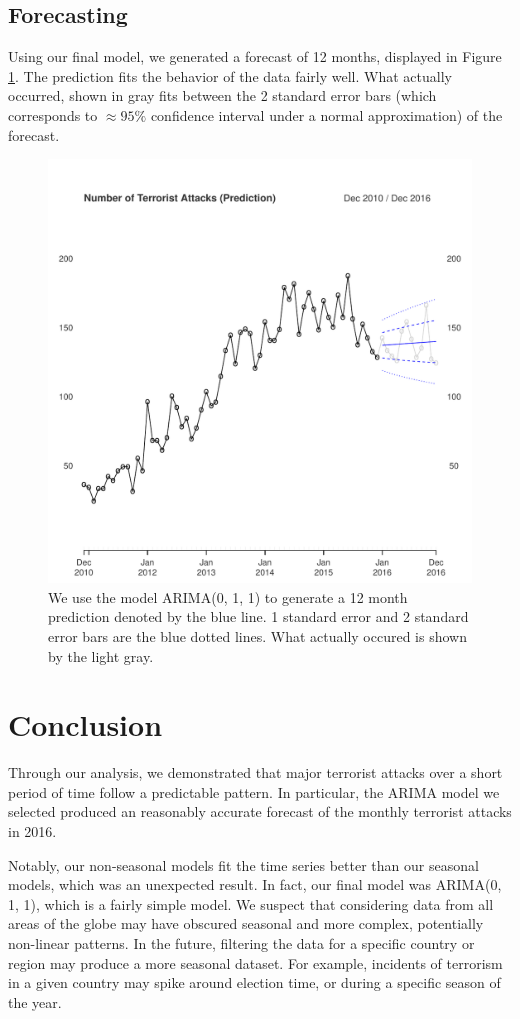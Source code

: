 \documentclass[11pt]{paper}
\begin{document}
\subsection{Forecasting}

Using our final model, we generated a forecast of 12 months, displayed in Figure \ref{prediction}. The prediction fits the behavior of the data fairly well.  What actually occurred, shown in gray fits between the 2 standard error bars (which corresponds to $\approx 95\%$ confidence interval under a normal approximation) of the forecast.


\begin{figure}
\centering
\includegraphics[width=0.75\linewidth]{../image/prediction_on_testing.pdf}
\caption{We use the model ARIMA(0, 1, 1) to generate a 12 month prediction denoted by the blue line. 1 standard error and 2 standard error bars are the blue dotted lines. What actually occured is shown by the light gray.}
\label{prediction}
\end{figure}



\section{Conclusion}
Through our analysis, we demonstrated that major terrorist attacks over a short period of time follow a predictable pattern. In particular, the ARIMA model we selected produced an reasonably accurate forecast of the monthly terrorist attacks in 2016.

Notably, our non-seasonal models fit the time series better than our seasonal models, which was an unexpected result. In fact, our final model was ARIMA(0, 1, 1), which is a fairly simple model. We suspect that considering data from all areas of the globe may have obscured seasonal and more complex, potentially non-linear patterns. In the future, filtering the data for a specific country or region may produce a more seasonal dataset. For example, incidents of terrorism in a given country may spike around election time, or during a specific season of the year.
\end{document}
